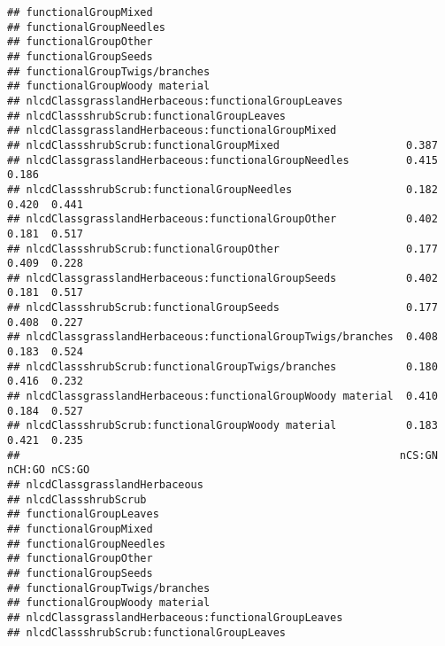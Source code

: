 \documentclass[]{article}
\begin{document}
\begin{verbatim}
## functionalGroupMixed                                                           
## functionalGroupNeedles                                                         
## functionalGroupOther                                                           
## functionalGroupSeeds                                                           
## functionalGroupTwigs/branches                                                  
## functionalGroupWoody material                                                  
## nlcdClassgrasslandHerbaceous:functionalGroupLeaves                             
## nlcdClassshrubScrub:functionalGroupLeaves                                      
## nlcdClassgrasslandHerbaceous:functionalGroupMixed                              
## nlcdClassshrubScrub:functionalGroupMixed                    0.387              
## nlcdClassgrasslandHerbaceous:functionalGroupNeedles         0.415  0.186       
## nlcdClassshrubScrub:functionalGroupNeedles                  0.182  0.420  0.441
## nlcdClassgrasslandHerbaceous:functionalGroupOther           0.402  0.181  0.517
## nlcdClassshrubScrub:functionalGroupOther                    0.177  0.409  0.228
## nlcdClassgrasslandHerbaceous:functionalGroupSeeds           0.402  0.181  0.517
## nlcdClassshrubScrub:functionalGroupSeeds                    0.177  0.408  0.227
## nlcdClassgrasslandHerbaceous:functionalGroupTwigs/branches  0.408  0.183  0.524
## nlcdClassshrubScrub:functionalGroupTwigs/branches           0.180  0.416  0.232
## nlcdClassgrasslandHerbaceous:functionalGroupWoody material  0.410  0.184  0.527
## nlcdClassshrubScrub:functionalGroupWoody material           0.183  0.421  0.235
##                                                            nCS:GN nCH:GO nCS:GO
## nlcdClassgrasslandHerbaceous                                                   
## nlcdClassshrubScrub                                                            
## functionalGroupLeaves                                                          
## functionalGroupMixed                                                           
## functionalGroupNeedles                                                         
## functionalGroupOther                                                           
## functionalGroupSeeds                                                           
## functionalGroupTwigs/branches                                                  
## functionalGroupWoody material                                                  
## nlcdClassgrasslandHerbaceous:functionalGroupLeaves                             
## nlcdClassshrubScrub:functionalGroupLeaves                                      

\end{verbatim}
\end{document}

